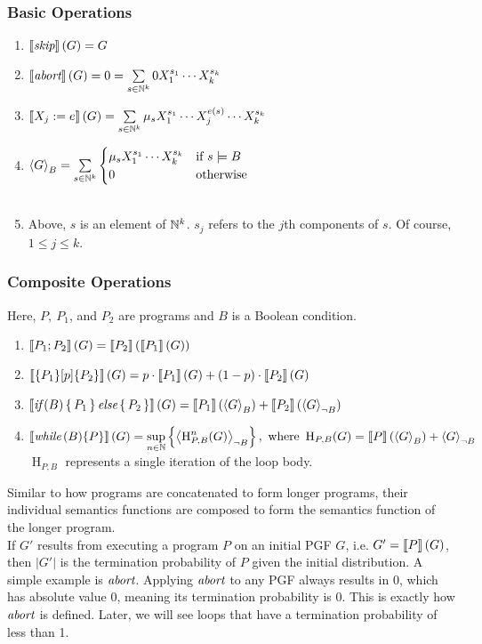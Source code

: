 \subsubsection*{Basic Operations}
\begin{enumerate}
	\item $\left\llbracket \textit{skip} \right\rrbracket(G) = G$
	\item $\left\llbracket \textit{abort} \right\rrbracket(G) = 0 = \sum\limits_{s \in \mathbb{N}^k} 0 X_1^{s_1} \cdots X_k^{s_k}$
	\item $\left\llbracket X_j := e \right\rrbracket(G) = \sum\limits_{s \in \mathbb{N}^k} \mu_s X_1^{s_1} \cdots X_j^{e(s)} \cdots X_k^{s_k}$
	\item
	$\left\langle G \right\rangle_{B} = \sum\limits_{s \in \mathbb{N}^k} \begin{cases}
	\mu_s X_1^{s_1} \cdots X_k^{s_k} &\text{if } s \models B \\
	0 & \text{otherwise}
	\end{cases}$ \\
	\\
	\item[] Above, $s$ is an element of $\mathbb{N}^k$.
	$s_j$ refers to the $j$th components of $s$.
	Of course, $1 \leq j \leq k$.
\end{enumerate}
\subsubsection*{Composite Operations}
Here, $P,\ P_1$, and $P_2$ are programs and $B$ is a Boolean condition.
\begin{enumerate}
	\item $\left\llbracket P_1; P_2 \right\rrbracket(G) = \left\llbracket P_2 \right\rrbracket( \left\llbracket P_1 \right\rrbracket(G) )$
	\item $\left\llbracket  \{P_1\}[p]\{P_2\}  \right\rrbracket(G) = p \cdot \left\llbracket P_1 \right\rrbracket(G) + (1-p) \cdot \left\llbracket P_2 \right\rrbracket(G)$
	\item $\left\llbracket \textit{if}\,(B) \, \{ \, P_1 \, \} \, \textit{else} \, \{ \, P_2 \, \} \right\rrbracket(G) = \left\llbracket P_1 \right\rrbracket(\left\langle G \right\rangle_{B}) + \left\llbracket P_2 \right\rrbracket(\left\langle G \right\rangle_{\lnot B})$
	\item $\left\llbracket \textit{while}\,(B) \{P\} \right\rrbracket(G) = \sup\limits_{n \in \mathbb{N}}
		\left\{ \left\langle \operatorname{H}_{P, B}^n(G) \right\rangle_{\lnot B} \right\}
		, \text{ where } \operatorname{H}_{P, B}(G) = \left\llbracket P \right\rrbracket(\left\langle G \right\rangle_{B}) + \left\langle G \right\rangle_{\lnot B}$ \\
		$\operatorname{H}_{P, B}$ represents a single iteration of the loop body.
\end{enumerate}
Similar to how programs are concatenated to form longer programs, their individual semantics functions are composed to form the semantics function of the longer program. \\
If $G'$ results from executing a program $P$ on an initial PGF $G$, i.e. $G' = \left\llbracket P \right\rrbracket(G)$, then $|G'|$ is the termination probability of $P$ given the initial distribution.
A simple example is $\textit{abort}$.
Applying $\textit{abort}$ to any PGF always results in 0, which has absolute value 0, meaning its termination probability is 0.
This is exactly how $\textit{abort}$ is defined.
Later, we will see loops that have a termination probability of less than 1.